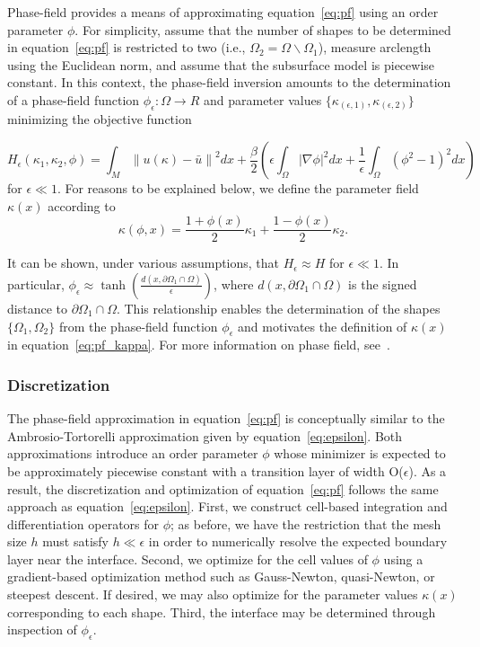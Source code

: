 \documentclass[manuscript,revised]{geophysics}
\newcommand\norm[1]{\left\lVert#1\right\rVert}
\begin{document}
Phase-field provides a means of approximating equation~\ref{eq:pf} using an order parameter $\phi$.  For simplicity, assume that the number of shapes to be determined in equation~\ref{eq:pf} is restricted to two (i.e., $\Omega_2=\Omega\backslash\Omega_1$), measure arclength using the Euclidean norm, and assume that the subsurface model is piecewise constant.  In this context, the phase-field inversion amounts to the determination of a phase-field function $\phi_\epsilon:\Omega \rightarrow R$ and parameter values $\{ \kappa_{(\epsilon,1)}, \kappa_{(\epsilon,2)} \}$ minimizing the objective function 

\begin{equation} \label{eq:pf_epsilon}
H_\epsilon \left( \kappa_1,\kappa_2,\phi \right)=\int_M \norm{u(\kappa)-\bar{u}}^2  dx +\frac{\beta}{2} \left( \epsilon \int_\Omega \left\vert \nabla \phi \right\vert^2 dx+\frac{1}{\epsilon} \int_\Omega  \left( \phi^2-1 \right)^2 dx \right)
\end{equation}
for $\epsilon \ll 1$.  For reasons to be explained below, we define the parameter field $\kappa(x)$ according to
\begin{equation} \label{eq:pf_kappa}
\kappa(\phi,x) = \frac{1+\phi(x)}{2} \kappa_1 + \frac{1-\phi(x)}{2} \kappa_2.
\end{equation}

It can be shown, under various assumptions, that $H_\epsilon \approx H$ for $\epsilon \ll 1$.  In particular, $\phi_\epsilon \approx \tanh{\left(  \frac{d \left( x, \partial\Omega_1 \cap \Omega \right)}{\epsilon}   \right) }$, where $d(x,\partial\Omega_1 \cap \Omega )$ is the signed distance to $\partial\Omega_1 \cap \Omega$. This relationship enables the determination of the shapes $\{\Omega_1, \Omega_2 \}$ from the phase-field function $\phi_\epsilon$ and motivates the definition of $\kappa(x)$ in equation~\ref{eq:pf_kappa}.  For more information on phase field, see~\cite{Deckelnick_2005}.


\subsubsection{Discretization}

The phase-field approximation in equation~\ref{eq:pf} is conceptually similar to the Ambrosio-Tortorelli approximation given by equation~\ref{eq:epsilon}.  Both approximations introduce an order parameter $\phi$ whose minimizer is expected to be approximately piecewise constant with a transition layer of width  O($\epsilon$).  As a result, the discretization and optimization of equation~\ref{eq:pf} follows the same approach as equation~\ref{eq:epsilon}.  First, we construct cell-based integration and differentiation operators for $\phi$; as before, we have the restriction that the mesh size $h$  must satisfy $h \ll \epsilon$ in order to numerically resolve the expected boundary layer near the interface. Second, we optimize for the cell values of $\phi$ using a gradient-based optimization method such as Gauss-Newton, quasi-Newton, or steepest descent.  If desired, we may also optimize for the parameter values $\kappa(x)$ corresponding to each shape.  Third, the interface may be determined through inspection of $\phi_\epsilon$.
\end{document}
